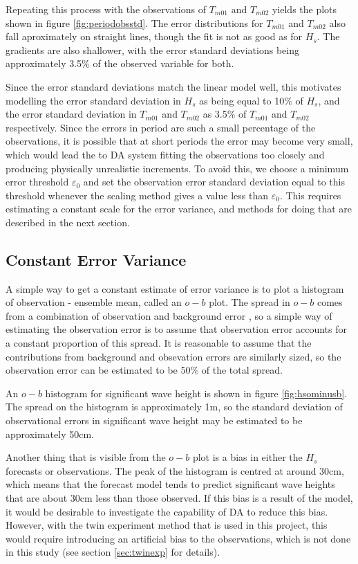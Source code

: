 Repeating this process with the observations of $T_{m01}$ and $T_{m02}$ yields the plots shown in figure \ref{fig:periodobsstd}. The error distributions for $T_{m01}$ and $T_{m02}$ also fall aproximately on straight lines, though the fit is not as good as for $H_s$. The gradients are also shallower, with the error standard deviations being approximately 3.5\% of the observed variable for both.

Since the error standard deviations match the linear model well, this motivates modelling the error standard deviation in $H_s$ as being equal to 10\% of $H_s$, and the error standard deviation in $T_{m01}$ and $T_{m02}$ as 3.5\% of $T_{m01}$ and $T_{m02}$ respectively. Since the errors in period are such a small percentage of the observations, it is possible that at short periods the error may become very small, which would lead the to DA system fitting the observations too closely and producing physically unrealistic increments. To avoid this, we choose a minimum error threshold $\varepsilon_0$ and set the observation error standard deviation equal to this threshold whenever the scaling method gives a value less than $\varepsilon_0$. This requires estimating a constant scale for the error variance, and methods for doing that are described in the next section.

\subsection{Constant Error Variance}
\label{sec:consterrs}

A simple way to get a constant estimate of error variance is to plot a histogram of observation - ensemble mean, called an $o - b$ plot. The spread in $o - b$ comes from a combination of observation and background error \citep{Desroziers2005}, so a simple way of estimating the observation error is to assume that observation error accounts for a constant proportion of this spread. It is reasonable to assume that the contributions from background and obsevation errors are similarly sized, so the observation error can be estimated to be 50\% of the total spread.

An $o - b$ histogram for significant wave height is shown in figure \ref{fig:hsominusb}. The spread on the histogram is approximately 1m, so the standard deviation of observational errors in significant wave height may be estimated to be approximately 50cm.

Another thing that is visible from the $o-b$ plot is a bias in either the $H_s$ forecasts or observations. The peak of the histogram is centred at around 30cm, which means that the forecast model tends to predict significant wave heights that are about 30cm less than those observed. If this bias is a result of the model, it would be desirable to investigate the capability of DA to reduce this bias. However, with the twin experiment method that is used in this project, this would require introducing an artificial bias to the observations, which is not done in this study (see section \ref{sec:twinexp} for details).

